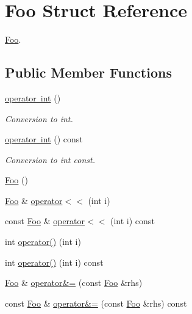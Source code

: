 \hypertarget{struct_foo}{}\section{Foo Struct Reference}
\label{struct_foo}


\mbox{\hyperlink{struct_foo}{Foo}}.  


\subsection*{Public Member Functions}
\begin{DoxyCompactItemize}
\item 
\mbox{\label{struct_foo_aab9774d892b6cd4a0fbebd034b4c1fad}} 
\mbox{\hyperlink{struct_foo_aab9774d892b6cd4a0fbebd034b4c1fad}{operator int}} ()
\begin{DoxyCompactList}\small\item\em Conversion to int. \end{DoxyCompactList}\item 
\mbox{\label{struct_foo_a1cd30e67501c6ff12bd6bf17af081449}} 
\mbox{\hyperlink{struct_foo_a1cd30e67501c6ff12bd6bf17af081449}{operator int}} () const
\begin{DoxyCompactList}\small\item\em Conversion to int const. \end{DoxyCompactList}\item 
\mbox{\hyperlink{struct_foo_a5c036d1b3561a0e1beffe8c6799a4276}{Foo}} ()
\item 
\mbox{\hyperlink{struct_foo}{Foo}} \& \mbox{\hyperlink{struct_foo_a279debd94d894223fa8468933e2d6188}{operator$<$$<$}} (int i)
\item 
const \mbox{\hyperlink{struct_foo}{Foo}} \& \mbox{\hyperlink{struct_foo_a48bcc3de9b2f1ad09a3518a0c9f0da61}{operator$<$$<$}} (int i) const
\item 
int \mbox{\hyperlink{struct_foo_a3a41dcf8c53f777d50676ea28400a640}{operator()}} (int i)
\item 
int \mbox{\hyperlink{struct_foo_ae3c9c1f33cdb8b932c6eb104660a262b}{operator()}} (int i) const
\item 
\mbox{\hyperlink{struct_foo}{Foo}} \& \mbox{\hyperlink{struct_foo_aa20bd44b1bb87a652ac65170ddfa1a5a}{operator\&=}} (const \mbox{\hyperlink{struct_foo}{Foo}} \&rhs)
\item 
const \mbox{\hyperlink{struct_foo}{Foo}} \& \mbox{\hyperlink{struct_foo_ab1a2a53ad5b2a0f97422630330c151fe}{operator\&=}} (const \mbox{\hyperlink{struct_foo}{Foo}} \&rhs) const

\end{DoxyCompactItemize}
